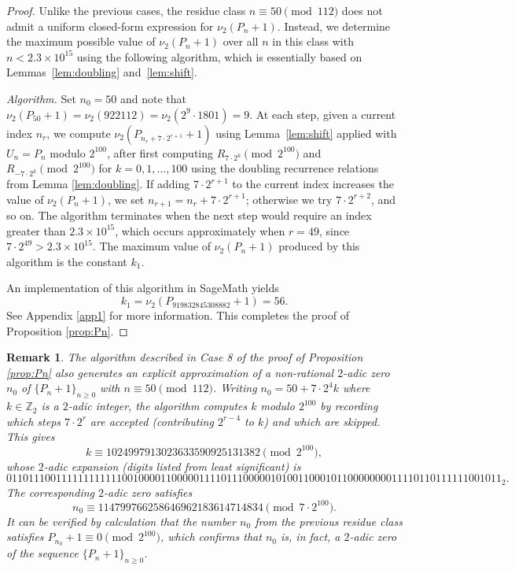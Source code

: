 \documentclass[11pt,a4paper]{article}
\newtheorem{remark}[theorem]{Remark}
\numberwithin{equation}{section}
\numberwithin{table}{section}
\numberwithin{figure}{section}
\begin{document}
\begin{proof}
	Unlike the previous cases, the residue class $n\equiv 50\pmod{112}$ does not admit 
	a uniform closed-form expression for $\nu_2(P_n+1)$. 
	Instead, we determine the maximum possible value of 
	$\nu_2(P_n+1)$ over all $n$ in this class with 
	$n<2.3\times 10^{15}$ using the following algorithm, which 
	is essentially based on Lemmas~\ref{lem:doubling} 
	and~\ref{lem:shift}.
	
	\medskip
	\noindent\textit{Algorithm.} Set $n_0=50$ and note that $\nu_2(P_{50}+1)=\nu_2(922112)=\nu_{2}(2^{9}\cdot 1801)=9$. At each step, given a current index 
	$n_r$, we compute $\nu_2(P_{n_r+7\cdot 2^{r+1}}+1)$ 
	using Lemma~\ref{lem:shift} applied with 
	$U_n=P_n$ modulo $2^{100}$, after first computing 
	$R_{7\cdot 2^k}\pmod{2^{100}}$ and 
	$R_{-7\cdot 2^k}\pmod{2^{100}}$ for 
	$k=0,1,\ldots,100$ using the doubling recurrence relations from 
	Lemma \ref{lem:doubling}. If adding $7\cdot 2^{r+1}$ 
	to the current index increases the value of $\nu_2(P_n+1)$, we set 
	$n_{r+1}=n_r+7\cdot 2^{r+1}$; otherwise we try 
	$7\cdot 2^{r+2}$, and so on. The algorithm terminates 
	when the next step would require an index greater than 
	$2.3\times 10^{15}$, which occurs approximately when
	$r=49$, since $7\cdot 2^{49}>2.3\times 10^{15}$. 
	The maximum value of $\nu_2(P_n+1)$ produced by this 
	algorithm is the constant $k_1$.
	
An implementation of this algorithm in SageMath yields 
\begin{equation*}
	k_{1}=\nu_{2}(P_{919832845308882}+1)= 56.
\end{equation*}
See Appendix \ref{app1} for more information. This completes the proof of Proposition \ref{prop:Pn}.
\end{proof}
\begin{remark}\label{rem:2adic-k}
The algorithm described in Case 8 of the proof of Proposition \ref{prop:Pn} also generates an explicit approximation of a non-rational $2$-adic zero $n_0$ of $\{P_n+1\}_{n\ge 0}$ with $n\equiv 50\pmod{112}$. Writing $n_0=50+7\cdot 2^{4}k$ where $k\in\mathbb{Z}_2$ is a $2$-adic integer, the algorithm computes $k$ modulo $2^{100}$ by recording which steps $7\cdot 2^r$ are accepted (contributing $2^{r-4}$ to $k$) and which are skipped. This gives
	\begin{equation*}
		k \equiv 1024997913023633590925131382
		\pmod{2^{100}},
	\end{equation*}
whose $2$-adic expansion (digits listed from least significant) is
$$
{{ 0 1 1 0 1 1 1 0 0 1 1 1 1 1 1 1 1 1 1 1 1 0 0 1 0 0 0 0 1 1 0 0 0 0 0 1 1 1 1 0 1 1 1 0 0 0 0 0 1 0 1 0 0 1 1 0 0 0 1 0 1 1 0 0 0 0 0 0 0 0 1 1 1 1 0 1 1 0 1 1 1 1 1 1 0 0 1 0 1 1_2.}}
$$
The corresponding $2$-adic zero satisfies
	\begin{equation*}
		n_0 \equiv 
		114799766258646962183614714834
		\pmod{7\cdot 2^{100}}.
	\end{equation*}
It can be verified by calculation that the number $n_0$ from the previous residue class satisfies $P_{n_0}+1\equiv 0\pmod{2^{100}}$, which confirms that $n_0$ is, in fact, a $2$-adic zero of the sequence $\{P_n+1\}_{n\ge 0}$.
\end{remark}
\end{document}
